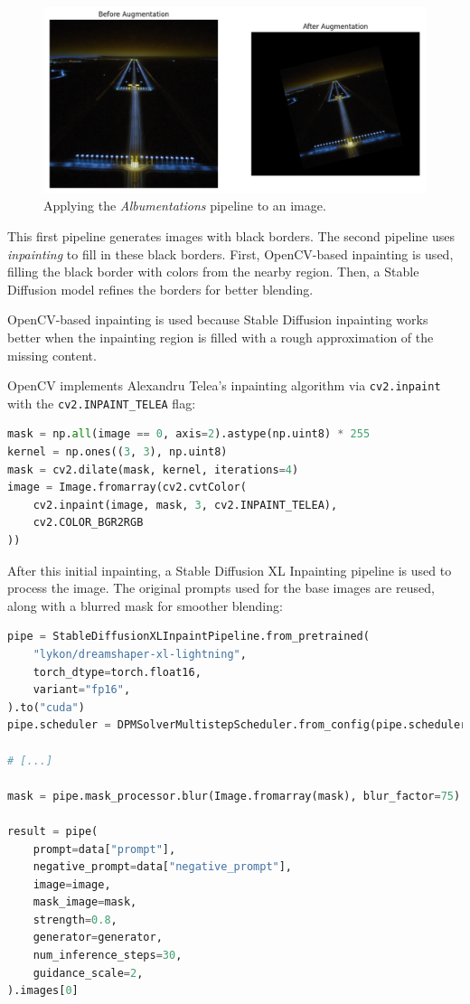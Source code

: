 \begin{figure}[htbp]
\centering
\includegraphics[width=1.0\textwidth]{figures/albumentations.png}
  \caption{Applying the \emph{Albumentations} pipeline to an image.}
\end{figure}

This first pipeline generates images with black borders. 
The second pipeline uses \emph{inpainting} to fill in these black borders. 
First, OpenCV-based inpainting is used, filling the black border with colors from the nearby region. 
Then, a Stable Diffusion model refines the borders for better blending.

OpenCV-based inpainting is used because Stable Diffusion inpainting works
better when the inpainting region is filled with a rough approximation of the
missing content.

OpenCV implements Alexandru Telea's inpainting algorithm \cite{telea_image_2004}
via \texttt{cv2.inpaint} with the \texttt{cv2.INPAINT\_TELEA} flag:

\begin{lstlisting}[language=Python, caption={Variant image generation module,
OpenCV-based inpainting}]
mask = np.all(image == 0, axis=2).astype(np.uint8) * 255
kernel = np.ones((3, 3), np.uint8)
mask = cv2.dilate(mask, kernel, iterations=4)
image = Image.fromarray(cv2.cvtColor(
    cv2.inpaint(image, mask, 3, cv2.INPAINT_TELEA),
    cv2.COLOR_BGR2RGB
))
\end{lstlisting}

After this initial inpainting, a Stable Diffusion XL Inpainting pipeline is used to process the image. 
The original prompts used for the base images are reused, along with a blurred mask for smoother blending:

\begin{lstlisting}[language=Python, caption={Variant image generation module,
Stable Diffusion XL Inpainting pipeline}]
pipe = StableDiffusionXLInpaintPipeline.from_pretrained(
    "lykon/dreamshaper-xl-lightning",
    torch_dtype=torch.float16,
    variant="fp16",
).to("cuda")
pipe.scheduler = DPMSolverMultistepScheduler.from_config(pipe.scheduler.config)

# [...]

mask = pipe.mask_processor.blur(Image.fromarray(mask), blur_factor=75)

result = pipe(
    prompt=data["prompt"],
    negative_prompt=data["negative_prompt"],
    image=image,
    mask_image=mask,
    strength=0.8,
    generator=generator,
    num_inference_steps=30,
    guidance_scale=2,
).images[0]
\end{lstlisting}

